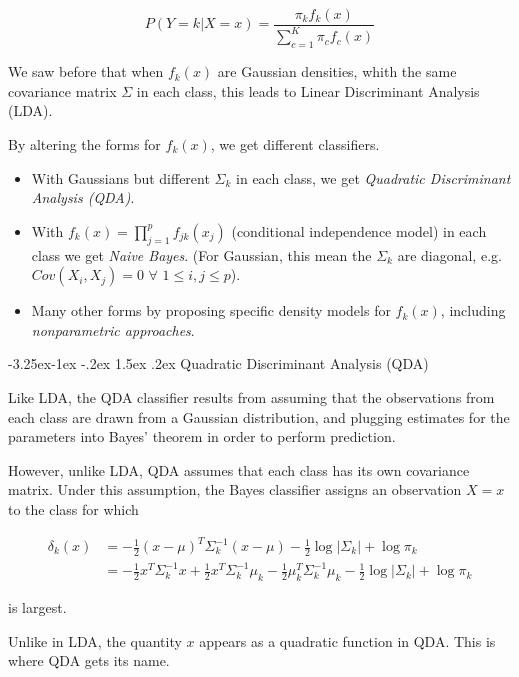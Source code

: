 \documentclass[]{book}
\makeatletter
\providecommand{\tightlist}{%
  \setlength{\itemsep}{0pt}\setlength{\parskip}{0pt}}
\renewcommand\subsection{\@startsection{subsection}{2}{\z@}%
                                     {-3.25ex\@plus -1ex \@minus -.2ex}%
                                     {1.5ex \@plus .2ex}%
                                     {\normalfont\large\bfseries\color{Violet}}}
\theoremstyle{definition}
\theoremstyle{definition}
\theoremstyle{definition}
\theoremstyle{remark}
\makeatother
\begin{document}
\[P(Y=k|X=x) = \frac{ \pi_k f_k(x)}{\sum_{c=1}^K \pi_c f_c(x)}\]

We saw before that when \(f_k(x)\) are Gaussian densities, whith the
same covariance matrix \(\Sigma\) in each class, this leads to Linear
Discriminant Analysis (LDA).

By altering the forms for \(f_k(x)\), we get different classifiers.

\begin{itemize}
\tightlist
\item
  With Gaussians but different \(\Sigma_k\) in each class, we get
  \emph{Quadratic Discriminant Analysis (QDA)}.
\item
  With \(f_k(x) = \prod_{j=1}^p f_{jk}(x_j)\) (conditional independence
  model) in each class we get \emph{Naive Bayes}. (For Gaussian, this
  mean the \(\Sigma_k\) are diagonal, e.g.
  \(Cov(X_i,X_j)=0 \,\, \forall \, \, 1\leq i,j \leq p\)).
\item
  Many other forms by proposing specific density models for \(f_k(x)\),
  including \emph{nonparametric approaches}.
\end{itemize}

\subsection{Quadratic Discriminant Analysis
(QDA)}\label{quadratic-discriminant-analysis-qda}

Like LDA, the QDA classiﬁer results from assuming that the observations
from each class are drawn from a Gaussian distribution, and plugging
estimates for the parameters into Bayes' theorem in order to perform
prediction.

However, unlike LDA, QDA assumes that each class has its own covariance
matrix. Under this assumption, the Bayes classiﬁer assigns an
observation \(X = x\) to the class for which

\begin{align*}
\delta_k(x) &= - \frac{1}{2} (x-\mu)^T \Sigma_k^{-1} (x-\mu) - \frac{1}{2} \log |\Sigma_k| + \log \pi_k \\
            &= - \frac{1}{2} x^T \Sigma_k^{-1} x + \frac{1}{2} x^T \Sigma_k^{-1} \mu_k - \frac{1}{2} \mu_k^T \Sigma_k^{-1} \mu_k - \frac{1}{2} \log |\Sigma_k| + \log \pi_k
\end{align*}

is largest.

Unlike in LDA, the quantity \(x\) appears as a quadratic function in
QDA. This is where QDA gets its name.
\end{document}
